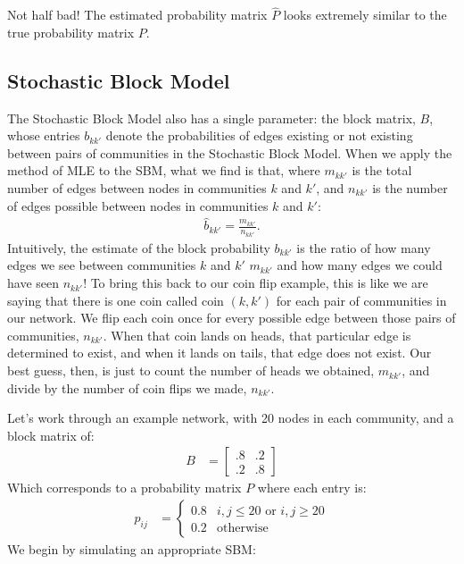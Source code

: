 \documentclass[letterpaper,10pt,english]{jupyterBook}
\begin{document}
\noindent{}

\sphinxAtStartPar
Not half bad! The estimated probability matrix \(\hat P\) looks extremely similar to the true probability matrix \(P\).


\subsection{Stochastic Block Model}
\label{\detokenize{representations/ch6/estimating-parameters_mle:stochastic-block-model}}
\sphinxAtStartPar
The Stochastic Block Model also has a single parameter: the block matrix, \(B\), whose entries \(b_{kk'}\) denote the probabilities of edges existing or not existing between pairs of communities in the Stochastic Block Model. When we apply the method of MLE to the SBM, what we find is that, where \(m_{kk'}\) is the total number of edges between nodes in communities \(k\) and \(k'\), and \(n_{kk'}\) is the number of edges possible between nodes in communities \(k\) and \(k'\):
\begin{align*}
    \hat b_{kk'} = \frac{m_{kk'}}{n_{kk'}}.
\end{align*}
\sphinxAtStartPar
Intuitively, the estimate of the block probability \(b_{kk'}\) is the ratio of how many edges we see between communities \(k\) and \(k'\) \(m_{kk'}\) and how many edges we could have seen \(n_{kk'}\)! To bring this back to our coin flip example, this is like we are saying that there is one coin called coin \((k, k')\) for each pair of communities in our network. We flip each coin once for every possible edge between those pairs of communities, \(n_{kk'}\). When that coin lands on heads, that particular edge is determined to exist, and when it lands on tails, that edge does not exist. Our best guess, then, is just to count the number of heads we obtained, \(m_{kk'}\), and divide by the number of coin flips we made, \(n_{kk'}\).

\sphinxAtStartPar
Let’s work through an example network, with 20 nodes in each community, and a block matrix of:
\begin{align*}
    B &= \begin{bmatrix}
        .8 & .2 \\
        .2 & .8
    \end{bmatrix}
\end{align*}
\sphinxAtStartPar
Which corresponds to a probability matrix \(P\) where each entry is:
\begin{align*}
    p_{ij} &= \begin{cases}
    0.8 & i, j \leq 20 \text{ or }i, j \geq 20 \\
    0.2 & \text{otherwise}
    \end{cases}
\end{align*}
\sphinxAtStartPar
We begin by simulating an appropriate SBM:
\end{document}
